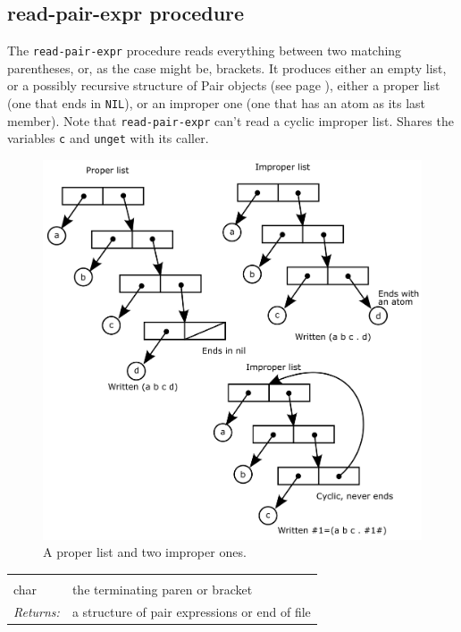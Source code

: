 \documentclass[twoside]{report}
\begin{document}
\subsection{read-pair-expr procedure}
\label{readpairexpr-procedure}

The \texttt{read-pair-expr} procedure reads everything between two matching parentheses, or, as the case might be, brackets. It produces either an empty list, or a possibly recursive structure of Pair objects (see page \pageref{pairs-and-lists}), either a proper list (one that ends in \texttt{NIL}), or an improper one (one that has an atom as its last member). Note that \texttt{read-pair-expr} can't read a cyclic improper list. Shares the variables \texttt{c} and \texttt{unget} with its caller.

\begin{figure}[h!]\includegraphics{images/prop-improp.png}\captionsetup{labelformat=empty}\caption{A proper list and two improper ones.}\label{fig:a-proper-list-and-two-improper-ones}\end{figure}

\noindent\begin{tabular}{ |p{1.9cm} p{8cm}| }
\hline
\rowcolor[HTML]{CCCCCC} \multicolumn{2}{|l|}{\bf read-pair-expr (internal)} \\
char & the terminating paren or bracket \\
\textit{Returns:} & a structure of pair expressions or end of file \\
\hline
\end{tabular}
\end{document}
